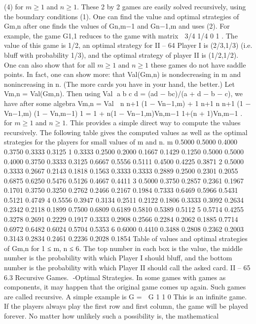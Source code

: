 \documentclass[]{report}
\begin{document}
(4)
for $m \geq 1$ and $n \geq 1$. These 2 by 2 games are easily solved recursively, using the boundary
conditions (1). One can find the value and optimal strategies of Gm,n after one finds the
values of Gn,m−1 and Gn−1,m and uses (2). For example, the game G1,1 reduces to the
game with matrix  3/4 1/4
0 1
. The value of this game is 1/2, an optimal strategy for
II – 64
Player I is (2/3,1/3) (i.e. bluff with probability 1/3), and the optimal strategy of player
II is (1/2,1/2).
One can also show that for all $m \geq 1$ and $n \geq 1$ these games do not have saddle points.
In fact, one can show more: that Val(Gm,n) is nondecreasing in m and nonincreasing in n.
(The more cards you have in your hand, the better.) Let Vm,n = Val(Gm,n). Then using
Val  a b
c d
= (ad − bc)/(a + d − b − c), we have after some algebra
Vm,n = Val  n
n+1 (1 − Vn−1,m) + 1
n+1
n
n+1 (1 − Vn−1,m)
(1 − Vn,m−1) 1
= 1 + n(1 − Vn−1,m)Vn,m−1
1+(n + 1)Vn,m−1
.
for $m \geq 1$ and $n \geq 1$. This provides a simple direct way to compute the values recursively.
The following table gives the computed values as well as the optimal strategies for the
players for small values of m and n.
m
0.5000 0.5000 0.4000 0.3750 0.3333 0.3125
1 0.3333 0.2500 0.2000 0.1667 0.1429 0.1250
0.5000 0.5000 0.4000 0.3750 0.3333 0.3125
0.6667 0.5556 0.5111 0.4500 0.4225 0.3871
2 0.5000 0.3333 0.2667 0.2143 0.1818 0.1563
0.3333 0.3333 0.2889 0.2500 0.2301 0.2055
0.6875 0.6250 0.5476 0.5126 0.4667 0.4411
3 0.5000 0.3750 0.2857 0.2361 0.1967 0.1701
0.3750 0.3250 0.2762 0.2466 0.2167 0.1984
0.7333 0.6469 0.5966 0.5431 0.5121 0.4749
4 0.5556 0.3947 0.3134 0.2511 0.2122 0.1806
0.3333 0.3092 0.2634 0.2342 0.2118 0.1899
0.7500 0.6809 0.6189 0.5810 0.5389 0.5112
5 0.5714 0.4255 0.3278 0.2691 0.2229 0.1917
0.3333 0.2908 0.2566 0.2284 0.2062 0.1885
0.7714 0.6972 0.6482 0.6024 0.5704 0.5353
6 0.6000 0.4410 0.3488 0.2808 0.2362 0.2003
0.3143 0.2834 0.2461 0.2236 0.2028 0.1854
Table of values and optimal strategies of Gm,n for 1 ≤ m, n ≤ 6. The top number in each
box is the value, the middle number is the probability with which Player I should bluff,
and the bottom number is the probability with which Player II should call the asked card.
II – 65
6.3 Recursive Games. -Optimal Strategies. In some games with games as
components, it may happen that the original game comes up again. Such games are called
recursive. A simple example is
G =
 G 1
1 0
This is an infinite game. If the players always play the first row and first column, the game
will be played forever. No matter how unlikely such a possibility is, the mathematical
\end{document}
